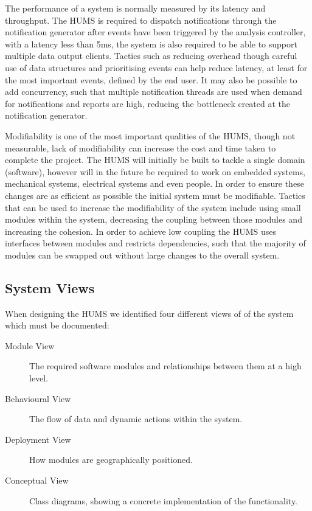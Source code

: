 \documentclass[10pt,a4paper]{article}
\begin{document}
The performance of a system is normally measured by its latency and throughput. The HUMS is required to dispatch notifications through the notification generator after events have been triggered by the analysis controller, with a latency less than 5ms, the system is 
also required to be able to support multiple data output clients. Tactics such as reducing overhead though careful use of data structures and prioritising events can help reduce latency, at least for the most important events, defined by the end user. It may also be possible to add concurrency, such that multiple notification threads are used when demand for notifications and reports are high, reducing the bottleneck created at the notification generator.

Modifiability is one of the most important qualities of the HUMS, though not measurable, lack of modifiability can increase the cost and time taken to complete the project. The HUMS will initially be built to tackle a single domain (software), however will in the future be required to work on embedded systems, mechanical systems, electrical systems and even people. In order to ensure these changes are as efficient as possible the initial system 
must be modifiable. Tactics that can be used to increase the modifiability of the system include using small modules within the system, decreasing the coupling between those modules and increasing the cohesion. In order to achieve low coupling  the HUMS uses interfaces between modules and restricts dependencies, such that the majority of modules can be swapped out without large changes to the overall system.

\subsection{System Views}
When designing the HUMS we identified four different views of of the system which must be documented:
\begin{description}
\item[Module View] The required software modules and relationships between them at a high level.
\item[Behavioural View] The flow of data and dynamic actions within the system.
\item[Deployment View] How modules are geographically positioned.
\item[Conceptual View] Class diagrams, showing a concrete implementation of the functionality.
\end{description}
\end{document}
